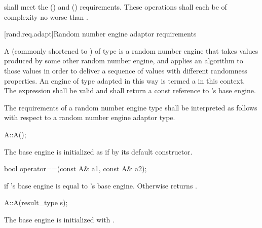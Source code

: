 \pnum
{} shall meet the
 ()
and  () requirements.
These operations shall each be of complexity
no worse than .


%



[rand.req.adapt]{Random number engine adaptor requirements}%

\pnum
A 
(commonly shortened to )
 of type 
is a random number engine
that takes values
produced by some other random number engine,
and applies an algorithm to those values
in order to deliver a sequence of values
with different randomness properties.
An engine  of type  adapted in this way
is termed a 
in this context.
The expression  shall be valid and shall return a
const reference to 's base engine.

\pnum
The requirements of a random number engine type
shall be interpreted as follows
with respect to a random number engine adaptor type.

\begin{itemdecl}
A::A();
\end{itemdecl}

\begin{itemdescr}
\pnum
\effects
 The base engine is initialized
 as if by its default constructor.
\end{itemdescr}

\begin{itemdecl}
bool operator==(const A& a1, const A& a2);
\end{itemdecl}

\begin{itemdescr}
\pnum
\returns
  if 's base engine is equal to 's base engine.
 Otherwise returns .
\end{itemdescr}

\begin{itemdecl}
A::A(result_type s);
\end{itemdecl}

\begin{itemdescr}
\pnum
\effects
 The base engine is initialized
 with .
\end{itemdescr}

